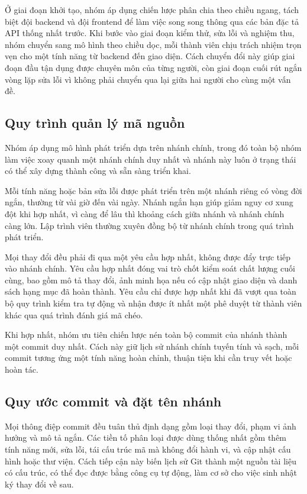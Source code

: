 \documentclass[12pt,a4paper,oneside]{report}
\begin{document}
Ở giai đoạn khởi tạo, nhóm áp dụng chiến lược phân chia theo chiều ngang, tách biệt đội backend và đội frontend để làm việc song song thông qua các bản đặc tả API thống nhất trước. Khi bước vào giai đoạn kiểm thử, sửa lỗi và nghiệm thu, nhóm chuyển sang mô hình theo chiều dọc, mỗi thành viên chịu trách nhiệm trọn vẹn cho một tính năng từ backend đến giao diện. Cách chuyển đổi này giúp giai đoạn đầu tận dụng được chuyên môn của từng người, còn giai đoạn cuối rút ngắn vòng lặp sửa lỗi vì không phải chuyển qua lại giữa hai người cho cùng một vấn đề.

\subsection{Quy trình quản lý mã nguồn}

Nhóm áp dụng mô hình phát triển dựa trên nhánh chính, trong đó toàn bộ nhóm làm việc xoay quanh một nhánh chính duy nhất và nhánh này luôn ở trạng thái có thể xây dựng thành công và sẵn sàng triển khai.

Mỗi tính năng hoặc bản sửa lỗi được phát triển trên một nhánh riêng có vòng đời ngắn, thường từ vài giờ đến vài ngày. Nhánh ngắn hạn giúp giảm nguy cơ xung đột khi hợp nhất, vì càng để lâu thì khoảng cách giữa nhánh và nhánh chính càng lớn. Lập trình viên thường xuyên đồng bộ từ nhánh chính trong quá trình phát triển.

Mọi thay đổi đều phải đi qua một yêu cầu hợp nhất, không được đẩy trực tiếp vào nhánh chính. Yêu cầu hợp nhất đóng vai trò chốt kiểm soát chất lượng cuối cùng, bao gồm mô tả thay đổi, ảnh minh họa nếu có cập nhật giao diện và danh sách hạng mục đã hoàn thành. Yêu cầu chỉ được hợp nhất khi đã vượt qua toàn bộ quy trình kiểm tra tự động và nhận được ít nhất một phê duyệt từ thành viên khác qua quá trình đánh giá mã chéo.

Khi hợp nhất, nhóm ưu tiên chiến lược nén toàn bộ commit của nhánh thành một commit duy nhất. Cách này giữ lịch sử nhánh chính tuyến tính và sạch, mỗi commit tương ứng một tính năng hoàn chỉnh, thuận tiện khi cần truy vết hoặc hoàn tác.

\subsection{Quy ước commit và đặt tên nhánh}

Mọi thông điệp commit đều tuân thủ định dạng gồm loại thay đổi, phạm vi ảnh hưởng và mô tả ngắn. Các tiền tố phân loại được dùng thống nhất gồm thêm tính năng mới, sửa lỗi, tái cấu trúc mã mà không đổi hành vi, và cập nhật cấu hình hoặc thư viện. Cách tiếp cận này biến lịch sử Git thành một nguồn tài liệu có cấu trúc, có thể đọc được bằng công cụ tự động, làm cơ sở cho việc sinh nhật ký thay đổi về sau.
\end{document}
